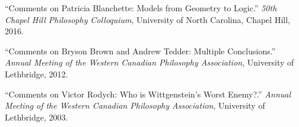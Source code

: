 \documentclass[11pt]{article}
\def\printdate#1{\xprintdate#1-}
\def\xprintdate#1-#2-#3-{#1}
\begin{document}
\ind ``Comments on Patricia Blanchette: Models from Geometry to Logic.'' \emph{50th Chapel Hill Philosophy Colloquium}, University of North Carolina, Chapel Hill, \printdate{2016-10-23}.
































































































\ind ``Comments on Bryson Brown and Andrew Tedder: Multiple Conclusions.'' \emph{Annual Meeting of the Western Canadian Philosophy Association}, University of Lethbridge, \printdate{2012-10-25}.


\ind ``Comments on Victor Rodych: Who is Wittgenstein's Worst Enemy?.'' \emph{Annual Meeting of the Western Canadian Philosophy Association}, University of Lethbridge, \printdate{2003-10-25}.
\end{document}
